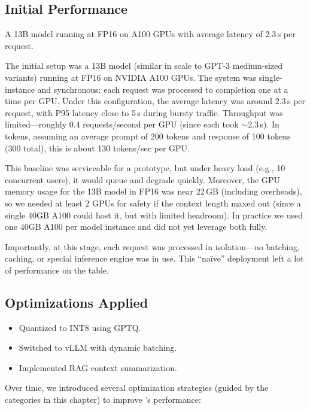 \subsection{Initial Performance}
A 13B model running at FP16 on A100 GPUs with average latency of 2.3\,s per request.

The initial setup was a 13B model (similar in scale to GPT-3 medium-sized variants) running at FP16 on NVIDIA A100 GPUs. The system was single-instance and synchronous: each request was processed to completion one at a time per GPU. Under this configuration, the average latency was around 2.3\,s per request, with P95 latency close to 5\,s during bursty traffic. Throughput was limited---roughly 0.4 requests/second per GPU (since each took $\sim$2.3\,s). In tokens, assuming an average prompt of 200 tokens and response of 100 tokens (300 total), this is about 130 tokens/sec per GPU.

This baseline was serviceable for a prototype, but under heavy load (e.g., 10 concurrent users), it would queue and degrade quickly. Moreover, the GPU memory usage for the 13B model in FP16 was near 22\,GB (including overheads), so we needed at least 2 GPUs for safety if the context length maxed out (since a single 40GB A100 could host it, but with limited headroom). In practice we used one 40GB A100 per model instance and did not yet leverage both fully.

Importantly, at this stage, each request was processed in isolation---no batching, caching, or special inference engine was in use. This “naïve” deployment left a lot of performance on the table.

\subsection{Optimizations Applied}
\begin{itemize}
    \item Quantized to INT8 using GPTQ.
    \item Switched to vLLM with dynamic batching.
    \item Implemented RAG context summarization.
\end{itemize}

Over time, we introduced several optimization strategies (guided by the categories in this chapter) to improve \ishtar{}’s performance:

